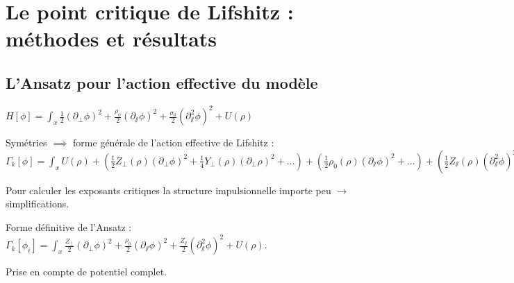 \documentclass[xcolor=dvipsnames]{beamer}
\newcommand{\p}[1]{\partial_{#1}}
\begin{document}
\section{Le point critique de Lifshitz : méthodes et résultats}
\subsection{L'Ansatz pour l'action effective du modèle}
\begin{frame}

\centering
$ H[\phi] = \int_x  \frac{1}{2}(\p{\perp} \phi)^2 + \frac{\rho_0}{2}(\p{\sslash} \phi)^2 + \frac{\sigma_0}{2} (\p{\sslash}^2 \phi)^2 + U(\rho)$

\begin{block}{Symétries $\implies$ forme générale de l'action effective de Lifshitz :}
$\Gamma_k[\phi] = \int_{x} U(\rho) + \left( \frac{1}{2} Z_\perp(\rho) (\partial_\perp \phi)^2 + \frac{1}{4} Y_\perp(\rho) (\partial_\perp \rho)^2 + ... \right) + \left( \frac{1}{2} \rho_0(\rho) (\partial_\sslash \phi)^2 + ... \right) + \left( \frac{1}{2} Z_\sslash(\rho) (\partial_\sslash^2 \phi)^2 + ... \right)$
\end{block}

Pour calculer les exposants critiques la structure impulsionnelle importe peu $\rightarrow$ simplifications.

\begin{block}{Forme définitive de l'Ansatz :}
$\Gamma_k[\phi_i] = \int_x  \frac{Z_\perp}{2} (\partial_\perp \phi)^2 + \frac{\rho_0}{2} (\partial_\sslash \phi)^2 + \frac{Z_\sslash}{2} (\partial_\sslash^2 \phi)^2 + U(\rho).$
\end{block}

Prise en compte de \textcolor{BrickRed}{potentiel complet}.
\end{frame}
\end{document}
